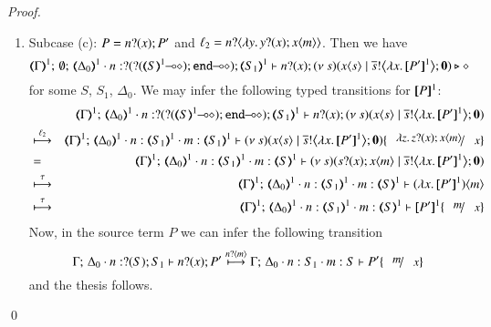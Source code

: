 \begin{proof}
\begin{enumerate}[1.]
	\item	Subcase (c): $P = n ? (x) ; P'$ and $\ell_2 = n ? \langle \lambda y.\,y ? (x) ; x\langle m \rangle \rangle$.
		Then we have
%
		\[
			\mapt{\Gamma}^{1};\, \emptyset;\, \mapt{\Delta_0}^{1} \cat 
			n: \btinp{\lhot{\btinp{\lhot{\tmap{S}{1}}}\tinact}} \tmap{S_1}{1}
			\proves
			\binp{n}{x} \newsp{s}{\appl{x}{s} \Par \bbout{\dual{s}}{\abs{x}{\pmap{P'}{1}}} \inact}
			\hastype \Proc
		\]
%
		for some $S$, $S_1$, $\Delta_0$.
		We may infer the following typed transitions for $[\!\![P]\!\!]^{1}$:
%
		\begin{eqnarray*}
			& & 
			\mapt{\Gamma}^{1};\, %
			\mapt{\Delta_0}^{1} \cat 
			n: \btinp{\lhot{\btinp{\lhot{\tmap{S}{1}}}\tinact}} \tmap{S_1}{1}
			\proves
			\binp{n}{x} \newsp{s}{\appl{x}{s} \Par \bbout{\dual{s}}{\abs{x}{\pmap{P'}{1}}} \inact} \\
			& \hby{\ell_2} & 
			\mapt{\Gamma}^{1};\, %
			\mapt{\Delta_0}^{1} \cat 
			n:\tmap{S_1}{1}
			\cat m:\tmap{S_1}{1}
			\proves
			\newsp{s}{\appl{x}{s} \Par \bbout{\dual{s}}{\abs{x}{\pmap{P'}{1}}} \inact} \subst{\abs{z}\binp{z}{x}\appl{x}{m}}{x} \\
			& = & 
			\mapt{\Gamma}^{1};\, %
			\mapt{\Delta_0}^{1} 
			\cat n:\tmap{S_1}{1}
			\cat m:\tmap{S}{1}
			\proves
			\newsp{s}{\binp{s}{x}\appl{x}{m} \Par \bbout{\dual{s}}{\abs{x}{\pmap{P'}{1}}} \inact}  \\
			& \hby{\tau} & 
			\mapt{\Gamma}^{1};\, %
			\mapt{\Delta_0}^{1} 
			\cat n:\tmap{S_1}{1}
			\cat m:\tmap{S}{1}
			\proves
			\appl{(\abs{x}{\pmap{P'}{1}})}{m}   \\
			& \hby{\tau} & 
			\mapt{\Gamma}^{1};\, %
			\mapt{\Delta_0}^{1} 
			\cat n:\tmap{S_1}{1}
			\cat m:\tmap{S}{1}
			\proves
			\pmap{P'}{1}\subst{m}{x}   
		\end{eqnarray*}
%
		Now, in the source term $P$ we can infer the following transition 
%
		\[
			\Gamma;\,  \Delta_0 \cat n:\btinp{S} S_1 \proves \binp{n}{x} P'
			\hby{\bactinp{n}{m}} 
			\Gamma;\,  \Delta_0 \cat n: S_1 \cat m: S \proves P'\subst{m}{x}
		\]
%
		and the thesis follows.

%
\end{enumerate}
\qed
\end{proof}



